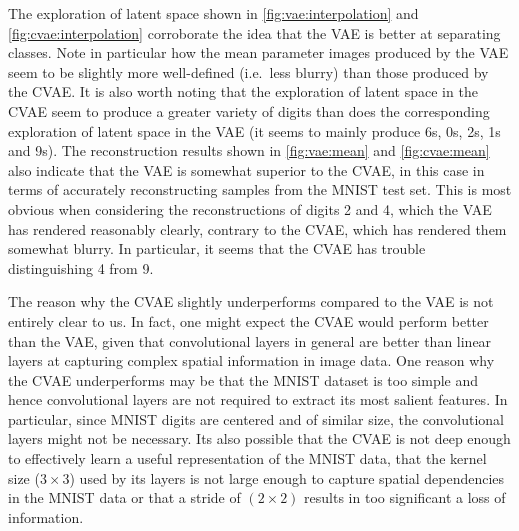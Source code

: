 The exploration of latent space shown in \cref{fig:vae:interpolation} and \cref{fig:cvae:interpolation} corroborate the idea that the VAE is better at separating classes. Note in particular how the mean parameter images produced by the VAE seem to be slightly more well-defined (i.e.\ less blurry) than those produced by the CVAE\@. It is also worth noting that the exploration of latent space in the CVAE seem to produce a greater variety of digits than does the corresponding exploration of latent space in the VAE (it seems to mainly produce 6s, 0s, 2s, 1s and 9s). The reconstruction results shown in \cref{fig:vae:mean} and \cref{fig:cvae:mean} also indicate that the VAE is somewhat superior to the CVAE, in this case in terms of accurately reconstructing samples from the MNIST test set. This is most obvious when considering the reconstructions of digits 2 and 4, which the VAE has rendered reasonably clearly, contrary to the CVAE, which has rendered them somewhat blurry. In particular, it seems that the CVAE has trouble distinguishing 4 from 9. 

The reason why the CVAE slightly underperforms compared to the VAE is not entirely clear to us. In fact, one might expect the CVAE would perform better than the VAE, given that convolutional layers in general are better than linear layers at capturing complex spatial information in image data. One reason why the CVAE underperforms may be that the MNIST dataset is too simple and hence convolutional layers are not required to extract its most salient features. In particular, since MNIST digits are centered and of similar size, the convolutional layers might not be necessary. Its also possible that the CVAE is not deep enough to effectively learn a useful representation of the MNIST data, that the kernel size ($3\times3$) used by its layers is not large enough to capture spatial dependencies in the MNIST data or that a stride of $(2\times2)$ results in too significant a loss of information. 